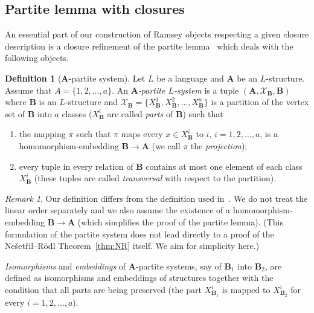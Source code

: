 \documentclass{elsarticle}
\def\str#1{\mathbf {#1}}
\theoremstyle{plain}
\theoremstyle{definition}
\newtheorem{definition}[theorem]{Definition}
\theoremstyle{remark}
\newtheorem*{remark}{Remark}
\begin{document}
\subsection{Partite lemma with closures}
\label{sec:partlem}
An essential part of our construction of Ramsey objects respecting a given closure description is a closure refinement of the partite lemma~\cite{Nevsetvril1989} which deals with the following objects.
\begin{definition}[$\str{A}$-partite system]
Let $L$ be a language and $\str{A}$ be an $L$-structure. Assume that $A = \{1, 2,\ldots, a\}$.  An \emph{$\str{A}$-partite $L$-system} is a tuple $(\str{A},{\mathcal X}_\str{B},\allowbreak \str{B})$ 
where $\str{B}$ is an $L$-struc\-ture and $\mathcal X_\str{B}=\{X^1_\str{B},X^2_\str{B},\ldots, X^a_\str{B}\}$  is a partition of the vertex set of $\str{B}$ into $a$ classes ($X^i_\str{B}$  are called \emph{parts} of $\str{B}$)  such that 
\begin{enumerate}
\item the mapping $\pi$ such that $\pi$ maps every $x \in X^i_\str{B}$ to $i$, $i = 1,2,\ldots,a$, is a
homo{\-}morphism-embedding $\str{B}\to\str{A}$ (we call $\pi$ the \emph{projection}); 
\item every tuple in every relation of $\str{B}$ contains at most one element of each class $X^i_\str{B}$ (these tuples are called \emph{transversal} with respect to the partition).
\end{enumerate}
\begin{remark}
Our definition differs from the definition used in~\cite{Nevsetvril1989}. We do not treat the linear order separately
and we also assume the existence of a homomorphism-embedding $\str{B}\to \str{A}$ (which simplifies the proof of the partite lemma). (This formulation of the partite system does not lead directly to a proof of the Ne\v set\v ril--R\"odl Theorem~\ref{thm:NR} itself. We aim for simplicity here.)
\end{remark}
\end{definition}
\emph{Isomorphisms} and \emph{embeddings} of $\str{A}$-partite systems, say of $\str{B}_1$ into $\str{B}_2$, are defined as isomorphisms and embeddings of structures together with the condition that all parts 
are being preserved (the part $X^i_{\str{B}_1}$ is mapped to $X^i_{\str{B}_2}$  for every $i = 1,2,\ldots,a$).
\end{document}
